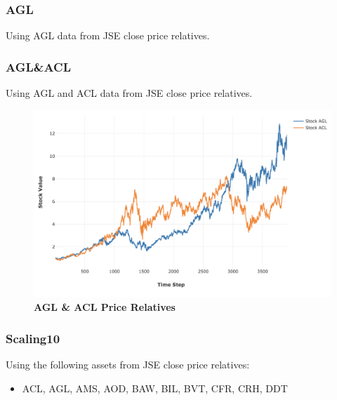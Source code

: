 \documentclass[a4paper,11pt,oneside]{article}
\theoremstyle{plain}
\theoremstyle{definition}
\begin{document}
	\subsubsection{AGL}\label{dataset_agl}
	
	Using AGL data from JSE close price relatives.
	
	\subsubsection{AGL\&ACL}\label{dataset_aglacl}
	
	Using AGL and ACL data from JSE close price relatives.
	
	\begin{figure}[H]
		\centering
		\includegraphics[scale=0.45]{images/results/prices/aglacl_prices.png} 
		\caption[AGL \& ACL Prices]{\textbf{AGL \& ACL Price Relatives}}
		\label{figure-aglacl_prices}
	\end{figure}
	
	
	\subsubsection{Scaling10}\label{dataset_scaling10}
	
	Using the following assets from JSE close price relatives:
	
	\begin{itemize}
		\item ACL, AGL, AMS, AOD, BAW, BIL, BVT, CFR, CRH, DDT
	\end{itemize}
	
\end{document}
